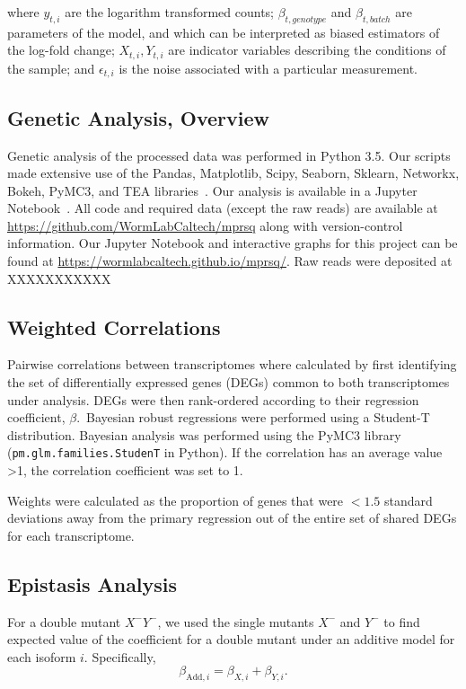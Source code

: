 \documentclass[10pt, onecolumn]{article}
\begin{document}
where $y_{t, i}$ are the logarithm transformed counts; $\beta_{t, genotype}$ and
$\beta_{t, batch}$ are parameters of the model, and which can be interpreted as
biased estimators of the log-fold change; $X_{t, i}, Y_{t, i}$ are indicator
variables describing the conditions of the sample; and $\epsilon_{t, i}$ is the
noise associated with a particular measurement.

\subsection*{Genetic Analysis, Overview}
Genetic analysis of the processed data was performed in Python 3.5. Our scripts
made extensive use of the Pandas, Matplotlib, Scipy, Seaborn, Sklearn, Networkx,
Bokeh, PyMC3, and TEA libraries~\cite{Team2014,McKinney2011,Oliphant2007,
Pedregosa2012,Salvatier2015,VanDerWalt2011,Hunter2007,Angeles-Albores2016,Waskom}.
Our analysis is available in a Jupyter Notebook~\cite{Perez2007}. All code and
required data (except the raw reads) are available at
\url{https://github.com/WormLabCaltech/mprsq} along with version-control
information. Our Jupyter Notebook and interactive graphs for this project can be
found at \url{https://wormlabcaltech.github.io/mprsq/}. Raw reads were deposited
at XXXXXXXXXXX


\subsection*{Weighted Correlations}
Pairwise correlations between transcriptomes where calculated by first identifying
the set of differentially expressed genes (DEGs) common to both transcriptomes under
analysis. DEGs were then rank-ordered according to their regression coefficient,
$\beta$.\ Bayesian robust regressions were performed using a Student-T distribution.
Bayesian analysis was performed using the PyMC3 library~\cite{Salvatier2015}
(\texttt{pm.glm.families.StudenT} in Python). If the correlation has an average
value >1, the correlation coefficient was set to 1.

Weights were calculated as the proportion of genes that were $<1.5$ standard deviations
away from the primary regression out of the entire set of shared DEGs for each
transcriptome.

\subsection*{Epistasis Analysis}
For a double mutant $X^-Y^-$, we used the single mutants $X^-$ and $Y^-$ to
find expected value of the coefficient for a double mutant under an additive model
for each isoform $i$.
Specifically,
\begin{equation}
  \beta_{\mathrm{Add},i} = \beta_{X,i} + \beta_{Y,i}.
\end{equation}
\end{document}
